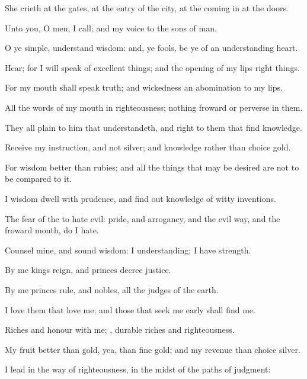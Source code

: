 {She
crieth
at the
gates, at the
entry of the
city, at the
coming in at the
doors.

Unto you, O
men, I
call; and my
voice
{} to the
sons of
man.

O ye
simple,
understand
wisdom: and, ye
fools, be ye of an
understanding
heart.

Hear; for I will
speak of excellent
things; and the
opening of my
lips
{} right
things.

For my
mouth shall
speak
truth; and
wickedness
{} an
abomination to my
lips.

All the
words of my
mouth
{} in
righteousness;
{} nothing
froward or
perverse in them.

They
{} all
plain to him that
understandeth, and
right to them that
find
knowledge.

Receive my
instruction, and not
silver; and
knowledge rather than
choice
gold.

For
wisdom
{}
better than
rubies; and all the things that may be
desired are not to be
compared to it.


\par }{\PP {}I
wisdom
dwell with
prudence, and find
out
knowledge of witty
inventions.

The
fear of the
{}
{} to
hate
evil:
pride, and
arrogancy, and the
evil
way, and the
froward
mouth, do I
hate.

Counsel
{} mine, and sound
wisdom: I
{}
understanding; I have
strength.

By me
kings
reign, and
princes
decree
justice.

By me
princes
rule, and
nobles,
{} all the
judges of the
earth.

I
love them that
love me; and those that seek me
early shall
find me.

Riches and
honour
{} with me;
{},
durable
riches and
righteousness.

My
fruit
{}
better than
gold, yea, than fine
gold; and my
revenue than
choice
silver.

I
lead in the
way of
righteousness, in the
midst of the
paths of
judgment:

}
